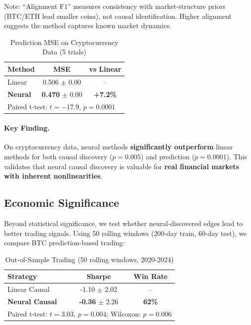 \documentclass[sigconf,nonacm]{acmart}
\begin{document}
Note: ``Alignment F1'' measures consistency with market-structure priors (BTC/ETH lead smaller coins), not causal identification. Higher alignment suggests the method captures known market dynamics.

\begin{table}[h]
\centering
\caption{Prediction MSE on Cryptocurrency Data (5 trials)}
\begin{tabular}{lcc}
\toprule
\textbf{Method} & \textbf{MSE} & \textbf{vs Linear} \\
\midrule
Linear & 0.506 $\pm$ 0.00 & -- \\
\textbf{Neural} & \textbf{0.470} $\pm$ 0.00 & \textbf{+7.2\%} \\
\bottomrule
\multicolumn{3}{l}{\small Paired t-test: $t=-17.9$, $p=0.0001$}
\end{tabular}
\label{tab:crypto_pred}
\end{table}

\paragraph{Key Finding.} On cryptocurrency data, neural methods \textbf{significantly outperform} linear methods for both causal discovery ($p=0.005$) and prediction ($p=0.0001$). This validates that neural causal discovery is valuable for \textbf{real financial markets with inherent nonlinearities}.

\subsection{Economic Significance}
Beyond statistical significance, we test whether neural-discovered edges lead to better trading signals. Using 50 rolling windows (200-day train, 60-day test), we compare BTC prediction-based trading:

\begin{table}[h]
\centering
\caption{Out-of-Sample Trading (50 rolling windows, 2020-2024)}
\begin{tabular}{lcc}
\toprule
\textbf{Strategy} & \textbf{Sharpe} & \textbf{Win Rate} \\
\midrule
Linear Causal & -1.10 $\pm$ 2.02 & -- \\
\textbf{Neural Causal} & \textbf{-0.36} $\pm$ 2.26 & \textbf{62\%} \\
\bottomrule
\multicolumn{3}{l}{\small Paired t-test: $t=3.03$, $p=0.004$; Wilcoxon: $p=0.006$}
\end{tabular}
\label{tab:economic}
\end{table}
\end{document}
